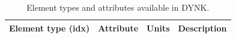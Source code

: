 \documentclass[a4paper,11pt]{report}
\begin{document}
\begin{table}[h]
\begin{center}
\caption{Element types and attributes available in DYNK.}
\label{tab:DYNK_SET} %
\begin{tabular}{|l | l l p{6cm}|}

  \hline
  \rowcolor{blue!30}
  Element type (idx) & Attribute & Units & Description \\
  \hline


  


\end{tabular}
\end{center}
\end{table}
\end{document}
